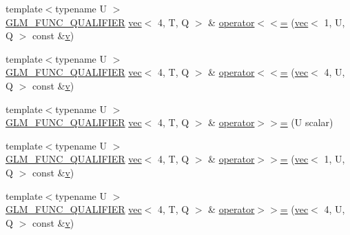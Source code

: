 \begin{DoxyCompactItemize}
{\footnotesize template$<$typename U $>$ }\\\mbox{\hyperlink{setup_8hpp_a33fdea6f91c5f834105f7415e2a64407}{G\+L\+M\+\_\+\+F\+U\+N\+C\+\_\+\+Q\+U\+A\+L\+I\+F\+I\+ER}} \mbox{\hyperlink{structglm_1_1vec}{vec}}$<$ 4, T, Q $>$ \& \mbox{\hyperlink{structglm_1_1vec_3_014_00_01_t_00_01_q_01_4_a49e438063ef5c5937a048b268c29e628}{operator$<$$<$=}} (\mbox{\hyperlink{structglm_1_1vec}{vec}}$<$ 1, U, Q $>$ const \&\mbox{\hyperlink{_s_d_l__opengl_8h_a10a82eabcb59d2fcd74acee063775f90}{v}})
\item 
{\footnotesize template$<$typename U $>$ }\\\mbox{\hyperlink{setup_8hpp_a33fdea6f91c5f834105f7415e2a64407}{G\+L\+M\+\_\+\+F\+U\+N\+C\+\_\+\+Q\+U\+A\+L\+I\+F\+I\+ER}} \mbox{\hyperlink{structglm_1_1vec}{vec}}$<$ 4, T, Q $>$ \& \mbox{\hyperlink{structglm_1_1vec_3_014_00_01_t_00_01_q_01_4_a0e69465cc359e717e6139e33aa441fde}{operator$<$$<$=}} (\mbox{\hyperlink{structglm_1_1vec}{vec}}$<$ 4, U, Q $>$ const \&\mbox{\hyperlink{_s_d_l__opengl_8h_a10a82eabcb59d2fcd74acee063775f90}{v}})
\item 
{\footnotesize template$<$typename U $>$ }\\\mbox{\hyperlink{setup_8hpp_a33fdea6f91c5f834105f7415e2a64407}{G\+L\+M\+\_\+\+F\+U\+N\+C\+\_\+\+Q\+U\+A\+L\+I\+F\+I\+ER}} \mbox{\hyperlink{structglm_1_1vec}{vec}}$<$ 4, T, Q $>$ \& \mbox{\hyperlink{structglm_1_1vec_3_014_00_01_t_00_01_q_01_4_a640417b459496600112faab1b74fcbf8}{operator$>$$>$=}} (U scalar)
\item 
{\footnotesize template$<$typename U $>$ }\\\mbox{\hyperlink{setup_8hpp_a33fdea6f91c5f834105f7415e2a64407}{G\+L\+M\+\_\+\+F\+U\+N\+C\+\_\+\+Q\+U\+A\+L\+I\+F\+I\+ER}} \mbox{\hyperlink{structglm_1_1vec}{vec}}$<$ 4, T, Q $>$ \& \mbox{\hyperlink{structglm_1_1vec_3_014_00_01_t_00_01_q_01_4_a83a91fd4b81cc0335d4310a2aed2f713}{operator$>$$>$=}} (\mbox{\hyperlink{structglm_1_1vec}{vec}}$<$ 1, U, Q $>$ const \&\mbox{\hyperlink{_s_d_l__opengl_8h_a10a82eabcb59d2fcd74acee063775f90}{v}})
\item 
{\footnotesize template$<$typename U $>$ }\\\mbox{\hyperlink{setup_8hpp_a33fdea6f91c5f834105f7415e2a64407}{G\+L\+M\+\_\+\+F\+U\+N\+C\+\_\+\+Q\+U\+A\+L\+I\+F\+I\+ER}} \mbox{\hyperlink{structglm_1_1vec}{vec}}$<$ 4, T, Q $>$ \& \mbox{\hyperlink{structglm_1_1vec_3_014_00_01_t_00_01_q_01_4_a44ce6a7a24c6f0b24eee2c09ae28796b}{operator$>$$>$=}} (\mbox{\hyperlink{structglm_1_1vec}{vec}}$<$ 4, U, Q $>$ const \&\mbox{\hyperlink{_s_d_l__opengl_8h_a10a82eabcb59d2fcd74acee063775f90}{v}})
\end{DoxyCompactItemize}
